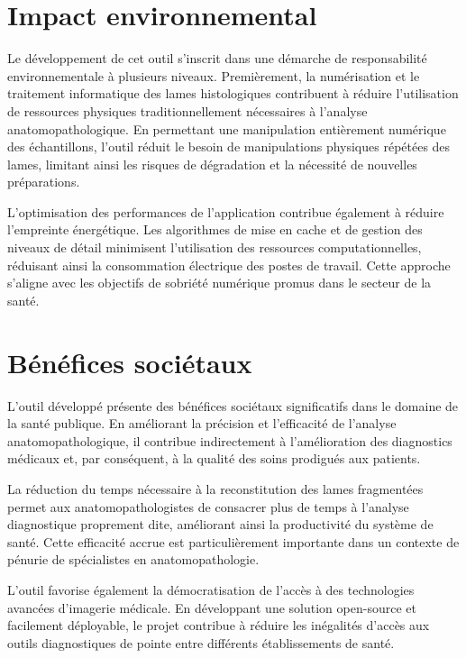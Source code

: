 \documentclass[12pt,a4paper]{report}
\begin{document}
\begin{}
\begin{}
\begin{}
\begin{}
\clearpage

\section{Impact environnemental}

Le développement de cet outil s'inscrit dans une démarche de responsabilité environnementale à plusieurs niveaux. Premièrement, la numérisation et le traitement informatique des lames histologiques contribuent à réduire l'utilisation de ressources physiques traditionnellement nécessaires à l'analyse anatomopathologique. En permettant une manipulation entièrement numérique des échantillons, l'outil réduit le besoin de manipulations physiques répétées des lames, limitant ainsi les risques de dégradation et la nécessité de nouvelles préparations.

L'optimisation des performances de l'application contribue également à réduire l'empreinte énergétique. Les algorithmes de mise en cache et de gestion des niveaux de détail minimisent l'utilisation des ressources computationnelles, réduisant ainsi la consommation électrique des postes de travail. Cette approche s'aligne avec les objectifs de sobriété numérique promus dans le secteur de la santé.

\section{Bénéfices sociétaux}

L'outil développé présente des bénéfices sociétaux significatifs dans le domaine de la santé publique. En améliorant la précision et l'efficacité de l'analyse anatomopathologique, il contribue indirectement à l'amélioration des diagnostics médicaux et, par conséquent, à la qualité des soins prodigués aux patients.

La réduction du temps nécessaire à la reconstitution des lames fragmentées permet aux anatomopathologistes de consacrer plus de temps à l'analyse diagnostique proprement dite, améliorant ainsi la productivité du système de santé. Cette efficacité accrue est particulièrement importante dans un contexte de pénurie de spécialistes en anatomopathologie.

L'outil favorise également la démocratisation de l'accès à des technologies avancées d'imagerie médicale. En développant une solution open-source et facilement déployable, le projet contribue à réduire les inégalités d'accès aux outils diagnostiques de pointe entre différents établissements de santé.


\end{}
\end{}
\end{}
\end{}
\end{document}
